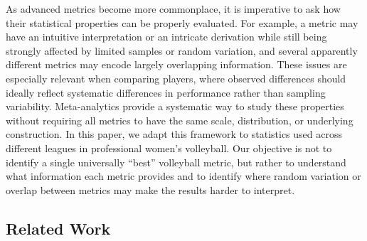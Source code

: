 \documentclass[
  12pt]{article}
\begin{document}
As advanced metrics become more commonplace, it is imperative to ask how
their statistical properties can be properly evaluated. For example, a
metric may have an intuitive interpretation or an intricate derivation
while still being strongly affected by limited samples or random
variation, and several apparently different metrics may encode largely
overlapping information. These issues are especially relevant when
comparing players, where observed differences should ideally reflect
systematic differences in performance rather than sampling variability.
Meta-analytics \citep{franks_meta-analytics_2016} provide a systematic
way to study these properties without requiring all metrics to have the
same scale, distribution, or underlying construction. In this paper, we
adapt this framework to statistics used across different leagues in
professional women's volleyball. Our objective is not to identify a
single universally ``best'' volleyball metric, but rather to understand
what information each metric provides and to identify where random
variation or overlap between metrics may make the results harder to
interpret.

\subsection{Related Work}\label{related-work}
\end{document}
